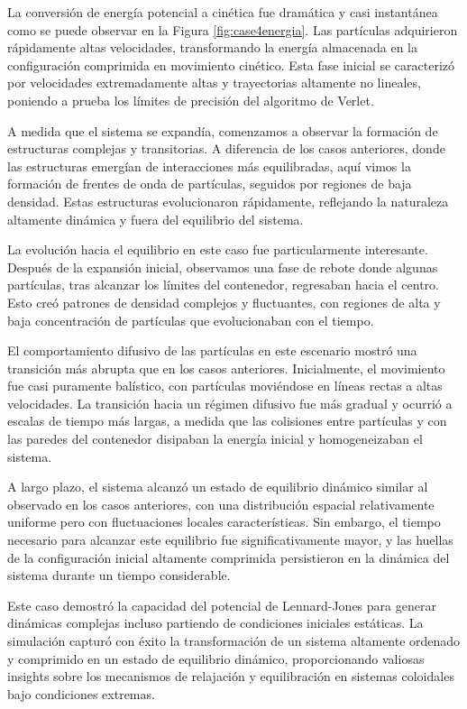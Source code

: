 \documentclass[twocolumn]{article}
\begin{document}
La conversión de energía potencial a cinética fue dramática y casi instantánea como se puede observar en la Figura \ref{fig:case4energia}. Las partículas adquirieron rápidamente altas velocidades, transformando la energía almacenada en la configuración comprimida en movimiento cinético. Esta fase inicial se caracterizó por velocidades extremadamente altas y trayectorias altamente no lineales, poniendo a prueba los límites de precisión del algoritmo de Verlet.

A medida que el sistema se expandía, comenzamos a observar la formación de estructuras complejas y transitorias. A diferencia de los casos anteriores, donde las estructuras emergían de interacciones más equilibradas, aquí vimos la formación de frentes de onda de partículas, seguidos por regiones de baja densidad. Estas estructuras evolucionaron rápidamente, reflejando la naturaleza altamente dinámica y fuera del equilibrio del sistema.

La evolución hacia el equilibrio en este caso fue particularmente interesante. Después de la expansión inicial, observamos una fase de rebote donde algunas partículas, tras alcanzar los límites del contenedor, regresaban hacia el centro. Esto creó patrones de densidad complejos y fluctuantes, con regiones de alta y baja concentración de partículas que evolucionaban con el tiempo.

El comportamiento difusivo de las partículas en este escenario mostró una transición más abrupta que en los casos anteriores. Inicialmente, el movimiento fue casi puramente balístico, con partículas moviéndose en líneas rectas a altas velocidades. La transición hacia un régimen difusivo fue más gradual y ocurrió a escalas de tiempo más largas, a medida que las colisiones entre partículas y con las paredes del contenedor disipaban la energía inicial y homogeneizaban el sistema.

A largo plazo, el sistema alcanzó un estado de equilibrio dinámico similar al observado en los casos anteriores, con una distribución espacial relativamente uniforme pero con fluctuaciones locales características. Sin embargo, el tiempo necesario para alcanzar este equilibrio fue significativamente mayor, y las huellas de la configuración inicial altamente comprimida persistieron en la dinámica del sistema durante un tiempo considerable.

Este caso demostró la capacidad del potencial de Lennard-Jones para generar dinámicas complejas incluso partiendo de condiciones iniciales estáticas. La simulación capturó con éxito la transformación de un sistema altamente ordenado y comprimido en un estado de equilibrio dinámico, proporcionando valiosas insights sobre los mecanismos de relajación y equilibración en sistemas coloidales bajo condiciones extremas.
\end{document}

